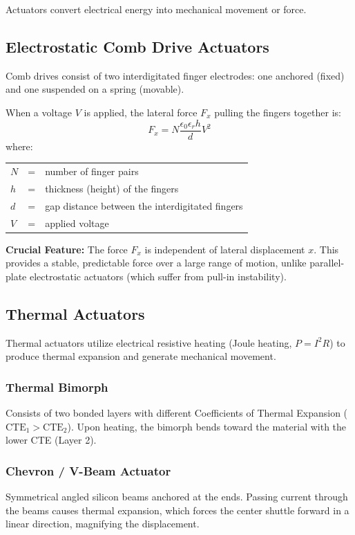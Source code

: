 \documentclass[12pt,a4paper]{article}
\begin{document}
Actuators convert electrical energy into mechanical movement or force.

\subsection{Electrostatic Comb Drive Actuators}
Comb drives consist of two interdigitated finger electrodes: one anchored (fixed) and one suspended on a spring (movable).

\begin{tcolorbox}[formulabox, title={Comb Drive Lateral Actuation Force}]
When a voltage $V$ is applied, the lateral force $F_x$ pulling the fingers together is:
$$F_x = N \frac{\epsilon_0 \epsilon_r h}{d} V^2$$
where:
\begin{tabular}{lcl}
$N$ & = & number of finger pairs \\
$h$ & = & thickness (height) of the fingers \\
$d$ & = & gap distance between the interdigitated fingers \\
$V$ & = & applied voltage
\end{tabular}
\end{tcolorbox}

\textbf{Crucial Feature:} The force $F_x$ is independent of lateral displacement $x$. This provides a stable, predictable force over a large range of motion, unlike parallel-plate electrostatic actuators (which suffer from pull-in instability).

\subsection{Thermal Actuators}
Thermal actuators utilize electrical resistive heating (Joule heating, $P = I^2 R$) to produce thermal expansion and generate mechanical movement.

\subsubsection{Thermal Bimorph}
Consists of two bonded layers with different Coefficients of Thermal Expansion ($\text{CTE}_1 > \text{CTE}_2$). Upon heating, the bimorph bends toward the material with the lower CTE (Layer 2).

\subsubsection{Chevron / V-Beam Actuator}
Symmetrical angled silicon beams anchored at the ends. Passing current through the beams causes thermal expansion, which forces the center shuttle forward in a linear direction, magnifying the displacement.
\end{document}
